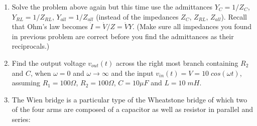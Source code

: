 \begin{enumerate}

\item Solve the problem above again but this time use the admittances 
$Y_C=1/Z_C$, $Y_{RL}=1/Z_{RL}$, $Y_{all}=1/Z_{all}$ (instead of the
impedances $Z_C$, $Z_{RL}$, $Z_{all}$). Recall that Ohm's law becomes
$\dot{I}=\dot{V}/Z=\dot{V}Y$. (Make sure all impedances you found in 
previous problem are correct before you find the admittances as their 
reciprocals.)




\item Find the output voltage $v_{out}(t)$ across the right most branch
containing $R_2$ and $C$, when $\omega=0$ and $\omega\rightarrow \infty$ 
and the input $v_{in}(t)=V=10\;cos(\omega t)$, assuming $R_1=100\Omega$, 
$R_2=100\Omega$, $C=10\mu F$ and $L=10\;mH$.


% 


\item The Wien bridge is a particular type of the Wheatstone bridge 
  of which two of the four arms are composed of a capacitor as well 
  as resistor in parallel and series:


\end{enumerate}
